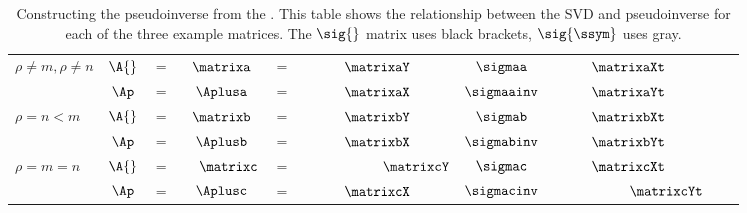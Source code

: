 \clearpage
\thispagestyle{empty}
\begin{landscape}
\begin{table}[htdp]
\caption[Constructing the pseudoinverse from the \asvd]{Constructing the pseudoinverse from the \asvd. This table shows the relationship between the SVD and pseudoinverse for each of the three example matrices. The $\sig{}$ matrix uses black brackets, $\sig{\ssym}$ uses gray.}
\begin{center}
\begin{tabular}{lccccccccc}
  $\rho \ne m, \rho \ne n$ \qquad \qquad & $\A{}$ & $=$ & $\matrixa$ & $=$ & $\matrixaY$ & $\sigmaa$ & $\matrixaXt$  \\[5pt]
%
                                   & $\Ap$ & $=$ & $\Aplusa$ & $=$ & $\matrixaX$ & $\sigmaainv$ & $\matrixaYt$  \\[25pt]\hline
  $\rho = n < m$     \qquad \qquad & $\A{}$ & $=$ & $\matrixb$ & $=$ & $\matrixbY$ & $\sigmab$ & $\matrixbXt$  \\[5pt]
%
                                   & $\Ap$ & $=$ & $\Aplusb$ & $=$ & $\matrixbX$ & $\sigmabinv$ & $\matrixbYt$  \\[25pt]\hline
  $\rho = m = n$     \qquad \qquad & $\A{}$ & $=$ & \, \, $\matrixc$ & $=$ & $\phantom{\recip{\sqrt{2}}}\matrixcY$ & $\sigmac$ & $\matrixcXt$  \\[5pt]
%
                                   & $\Ap$ & $=$ & $\Aplusc$ & $=$ & $\matrixcX$ & $\sigmacinv$ & $\phantom{\recip{\sqrt{2}}}\matrixcYt$  %
\end{tabular}
\end{center}
\label{tab:mpp constructions}
\end{table}
\end{landscape}

\endinput